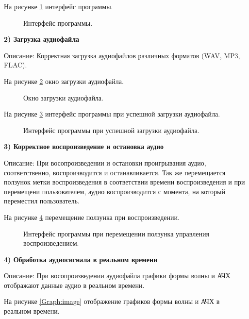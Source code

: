 На рисунке \ref{Interface:image} интерфейс программы.

\begin{figure}[ht]
	\caption{Интерфейс программы.}
	\label{Interface:image}
\end{figure}
\clearpage

\textbf{2) Загрузка аудиофайла}

Описание: Корректная загрузка аудиофайлов различных форматов (WAV, MP3, FLAC).

На рисунке \ref{LoadWindow:image} окно загрузки аудиофайла.

\begin{figure}[ht]
	\caption{Окно загрузки аудиофайла.}
	\label{LoadWindow:image}
\end{figure}

На рисунке \ref{InterLoad:image} интерфейс программы при успешной загрузки аудиофайла.

\begin{figure}[ht]
	\caption{Интерфейс программы при успешной загрузки аудиофайла.}
	\label{InterLoad:image}
\end{figure}

\textbf{3) Корректное воспроизведение и остановка аудио}

Описание: При восопроизведении и остановки проигрывания аудио, соответственно, воспроизводится и останавливается. Так же перемещается ползунок метки воспроизведения в соответствии времени воспроизведения и при перемещени пользователем, аудио воспроизводится с момента, на который переместил пользователь.

На рисунке \ref{SliderTime:image} перемещение ползунка при воспроизведении.

\begin{figure}[ht]
	\caption{Интерфейс программы при перемещении ползунка управления воспроизведением.}
	\label{SliderTime:image}
\end{figure}
\clearpage

\textbf{4) Обработка аудиосигнала в реальном времени}

Описание: При восопроизведении аудиофайла графики формы волны и АЧХ отображают данные аудио в реальном времени.

На рисунке \ref{Graph:image} отображение графиков формы волны и АЧХ в реальном времени.

